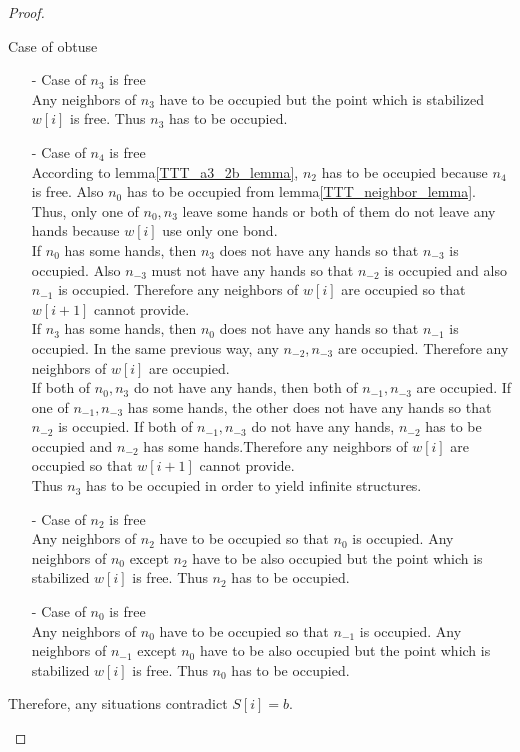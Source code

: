 \documentclass[runningheads]{llncs}
\begin{document}
\begin{proof}
\begin{paragraph}{Case of obtuse}
\begin{itemize}
\item[-] Case of $n_3$ is free\\
Any neighbors of $n_3$ have to be occupied but the point which is stabilized $w[i]$ is free. Thus $n_3$ has to be occupied.
\item[-] Case of $n_4$ is free\\
According to lemma\ref{TTT_a3_2b_lemma}, $n_2$ has to be occupied because $n_4$ is free. Also $n_0$ has to be occupied from lemma\ref{TTT_neighbor_lemma}. Thus, only one of $n_0, n_3$ leave some hands or both of them do not leave any hands because $w[i]$ use only one bond.\\
If $n_0$ has some hands, then $n_3$ does not have any hands so that $n_{-3}$ is occupied. Also $n_{-3}$ must not have any hands so that $n_{-2}$ is occupied and also $n_{-1}$ is occupied. Therefore any neighbors of $w[i]$ are occupied so that $w[i+1]$ cannot provide.\\
If $n_3$ has some hands, then $n_0$ does not have any hands so that $n_{-1}$ is occupied. In the same previous way, any $n_{-2}, n_{-3}$ are occupied.  Therefore any neighbors of $w[i]$ are occupied.\\
If both of $n_0, n_3$ do not have any hands, then both of $n_{-1}, n_{-3}$ are occupied. If one of $n_{-1}, n_{-3}$ has some hands, the other does not have any hands so that $n_{-2}$ is occupied. If both of $n_{-1}, n_{-3}$ do not have any hands, $n_{-2}$ has to be occupied and $n_{-2}$ has some hands.Therefore any neighbors of $w[i]$ are occupied so that $w[i+1]$ cannot provide.\\
Thus $n_3$ has to be occupied in order to yield infinite structures.
\item[-] Case of $n_2$ is free\\
Any neighbors of $n_2$ have to be occupied so that $n_0$ is occupied. Any neighbors of $n_0$ except $n_2$ have to be also occupied but the point which is stabilized $w[i]$ is free. Thus $n_2$ has to be occupied.
\item[-] Case of $n_0$ is free\\
Any neighbors of $n_0$ have to be occupied so that $n_{-1}$ is occupied. Any neighbors of $n_{-1}$ except $n_0$ have to be also occupied but the point which is stabilized $w[i]$ is free. Thus $n_0$ has to be occupied. 
\end{itemize}

Therefore, any situations contradict $S[i] = b$.


\end{paragraph}
\end{proof}
\end{document}
